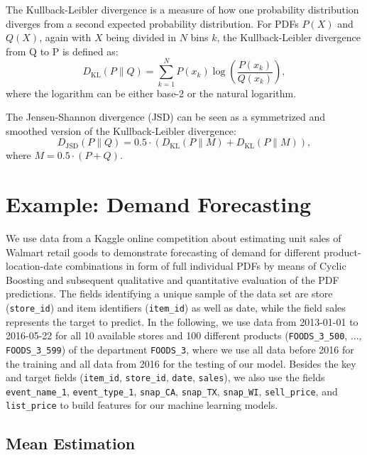 \documentclass[BCOR=1mm, DIV=calc,10pt,
twoside=true,
twocolumn,
headings=normal]{scrartcl}
\begin{document}
The Kullback-Leibler divergence is a measure of how one probability distribution diverges from a second expected probability distribution. For PDFs $P(X)$ and $Q(X)$, again with $X$ being divided in $N$ bins $k$, the Kullback-Leibler divergence from Q to P is defined as:
\begin{equation}
D_{\text{KL}}(P \parallel Q) = \sum _{k=1}^N P(x_k) \log \left({\frac{P(x_k)}{Q(x_k)}}\right),
\end{equation}
where the logarithm can be either base-2 or the natural logarithm.

The Jensen-Shannon divergence (JSD) can be seen as a symmetrized and smoothed version of the Kullback-Leibler divergence:
\begin{equation}
D_{\text{JSD}}(P \parallel Q) = 0.5  \cdot (D_{\text{KL}}(P \parallel M) + D_{\text{KL}}(P \parallel M)),
\end{equation}
where $M = 0.5  \cdot (P + Q)$.


\section{Example: Demand Forecasting}
\label{sec:example}

We use data from a Kaggle online competition about estimating unit sales of Walmart retail goods \cite{kaggle_data} to demonstrate forecasting of demand for different product-location-date combinations in form of full individual PDFs by means of Cyclic Boosting and subsequent qualitative and quantitative evaluation of the PDF predictions. The fields identifying a unique sample of the data set are store (\texttt{store\_id}) and item identifiers (\texttt{item\_id}) as well as date, while the field sales represents the target to predict. In the following, we use data from 2013-01-01 to 2016-05-22 for all 10 available stores and 100 different products (\texttt{FOODS\_3\_500}, ..., \texttt{FOODS\_3\_599}) of the department \texttt{FOODS\_3}, where we use all data before 2016 for the training and all data from 2016 for the testing of our model. Besides the key and target fields (\texttt{item\_id}, \texttt{store\_id}, \texttt{date}, \texttt{sales}), we also use the fields \texttt{event\_name\_1}, \texttt{event\_type\_1}, \texttt{snap\_CA}, \texttt{snap\_TX}, \texttt{snap\_WI}, \texttt{sell\_price}, and \texttt{list\_price} to build features for our machine learning models.

\subsection{Mean Estimation}
\label{sec:example_mean}
\end{document}
